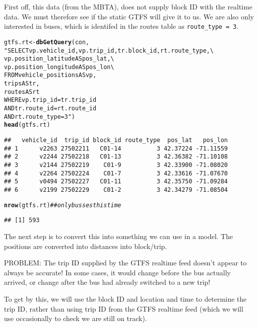 \documentclass[10pt]{article}\usepackage[]{graphicx}\usepackage[]{color}
\makeatletter
\newcommand{\hlstr}[1]{\textcolor[rgb]{0.192,0.494,0.8}{#1}}%
\newcommand{\hlcom}[1]{\textcolor[rgb]{0.678,0.584,0.686}{\textit{#1}}}%
\newcommand{\hlstd}[1]{\textcolor[rgb]{0.345,0.345,0.345}{#1}}%
\newcommand{\hlkwb}[1]{\textcolor[rgb]{0.69,0.353,0.396}{#1}}%
\newcommand{\hlkwd}[1]{\textcolor[rgb]{0.737,0.353,0.396}{\textbf{#1}}}%
\newenvironment{kframe}{%
 \def\at@end@of@kframe{}%
 \ifinner\ifhmode%
  \def\at@end@of@kframe{\end{minipage}}%
  \begin{minipage}{\columnwidth}%
 \fi\fi%
 \def\FrameCommand##1{\hskip\@totalleftmargin \hskip-\fboxsep
 \colorbox{shadecolor}{##1}\hskip-\fboxsep
     \hskip-\linewidth \hskip-\@totalleftmargin \hskip\columnwidth}%
 \MakeFramed {\advance\hsize-\width
   \@totalleftmargin\z@ \linewidth\hsize
   \@setminipage}}%
 {\par\unskip\endMakeFramed%
 \at@end@of@kframe}
\newenvironment{knitrout}{}{} %
\makeatother
\begin{document}
First off, this data (from the MBTA), does not supply block ID with the realtime data.
We must therefore see if the static GTFS will give it to us.
We are also only interested in buses, which is identifed in the routes table as \texttt{route\_type = 3}.
\begin{knitrout}
\color{fgcolor}\begin{kframe}
\begin{alltt}
\hlstd{gtfs.rt} \hlkwb{<-} \hlkwd{dbGetQuery}\hlstd{(con,}
                      \hlstr{"SELECT vp.vehicle_id, vp.trip_id, tr.block_id, rt.route_type, \textbackslash{}
                              vp.position_latitude AS pos_lat, \textbackslash{}
                              vp.position_longitude AS pos_lon \textbackslash{}
                         FROM vehicle_positions AS vp, 
                              trips             AS tr, 
                              routes            AS rt
                        WHERE vp.trip_id    = tr.trip_id 
                          AND tr.route_id   = rt.route_id 
                          AND rt.route_type = 3"}\hlstd{)}
\hlkwd{head}\hlstd{(gtfs.rt)}
\end{alltt}
\begin{verbatim}
##   vehicle_id  trip_id block_id route_type  pos_lat   pos_lon
## 1      v2263 27502211   C01-14          3 42.37224 -71.11559
## 2      v2244 27502218   C01-13          3 42.36382 -71.10108
## 3      v2144 27502219    C01-9          3 42.33900 -71.08020
## 4      v2264 27502224    C01-7          3 42.33616 -71.07670
## 5      v0494 27502227   C01-11          3 42.35750 -71.09284
## 6      v2199 27502229    C01-2          3 42.34279 -71.08504
\end{verbatim}
\begin{alltt}
\hlkwd{nrow}\hlstd{(gtfs.rt)} \hlcom{## only busses this time}
\end{alltt}
\begin{verbatim}
## [1] 593
\end{verbatim}
\end{kframe}
\end{knitrout}
The next step is to convert this into something we can use in a model.
The positions are converted into distances into block/trip.

PROBLEM: The trip ID supplied by the GTFS realtime feed doesn't appear to always be
accurate! In some cases, it would change before the bus actually arrived, or change after
the bus had already switched to a new trip!

To get by this, we will use the block ID and location and time to determine the trip ID,
rather than using trip ID from the GTFS realtime feed (which we will use occasionally to
check we are still on track).
\end{document}
